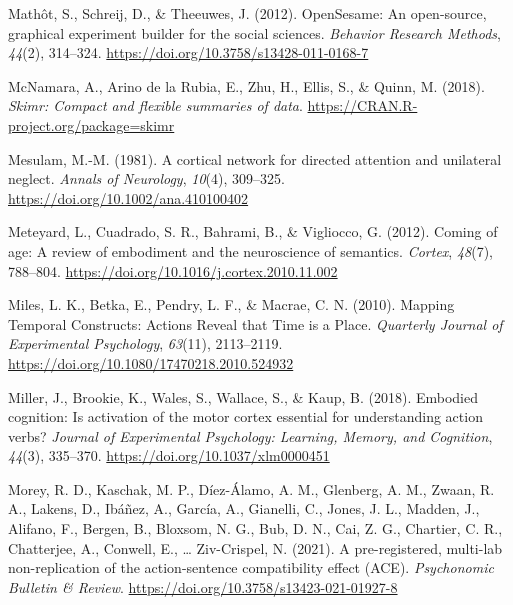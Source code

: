 \documentclass[
  a4paper,12pt,twoside,onecolumn,openright,final,oldfontcommands]{memoir}
\newlength{\cslhangindent}
\newlength{\cslentryspacingunit} %
\newenvironment{CSLReferences}[2] %
 {%
  \setlength{\parindent}{0pt}
  \ifodd #1
  \let\oldpar\par
  \def\par{\hangindent=\cslhangindent\oldpar}
  \fi
  \setlength{\parskip}{#2\cslentryspacingunit}
 }%
 {}
\begin{document}
\begin{CSLReferences}{1}{0}
\leavevmode{}%
Mathôt, S., Schreij, D., \& Theeuwes, J. (2012). {OpenSesame}: {An} open-source, graphical experiment builder for the social sciences. \emph{Behavior Research Methods}, \emph{44}(2), 314--324. \url{https://doi.org/10.3758/s13428-011-0168-7}

\leavevmode{}%
McNamara, A., Arino de la Rubia, E., Zhu, H., Ellis, S., \& Quinn, M. (2018). \emph{Skimr: Compact and flexible summaries of data}. \url{https://CRAN.R-project.org/package=skimr}

\leavevmode{}%
Mesulam, M.-M. (1981). A cortical network for directed attention and unilateral neglect. \emph{Annals of Neurology}, \emph{10}(4), 309--325. \url{https://doi.org/10.1002/ana.410100402}

\leavevmode{}%
Meteyard, L., Cuadrado, S. R., Bahrami, B., \& Vigliocco, G. (2012). Coming of age: {A} review of embodiment and the neuroscience of semantics. \emph{Cortex}, \emph{48}(7), 788--804. \url{https://doi.org/10.1016/j.cortex.2010.11.002}

\leavevmode{}%
Miles, L. K., Betka, E., Pendry, L. F., \& Macrae, C. N. (2010). Mapping {Temporal} {Constructs}: {Actions} {Reveal} that {Time} is a {Place}. \emph{Quarterly Journal of Experimental Psychology}, \emph{63}(11), 2113--2119. \url{https://doi.org/10.1080/17470218.2010.524932}

\leavevmode{}%
Miller, J., Brookie, K., Wales, S., Wallace, S., \& Kaup, B. (2018). Embodied cognition: {Is} activation of the motor cortex essential for understanding action verbs? \emph{Journal of Experimental Psychology: Learning, Memory, and Cognition}, \emph{44}(3), 335--370. \url{https://doi.org/10.1037/xlm0000451}

\leavevmode{}%
Morey, R. D., Kaschak, M. P., Díez-Álamo, A. M., Glenberg, A. M., Zwaan, R. A., Lakens, D., Ibáñez, A., García, A., Gianelli, C., Jones, J. L., Madden, J., Alifano, F., Bergen, B., Bloxsom, N. G., Bub, D. N., Cai, Z. G., Chartier, C. R., Chatterjee, A., Conwell, E., \ldots{} Ziv-Crispel, N. (2021). A pre-registered, multi-lab non-replication of the action-sentence compatibility effect ({ACE}). \emph{Psychonomic Bulletin \& Review}. \url{https://doi.org/10.3758/s13423-021-01927-8}


\end{CSLReferences}
\end{document}
